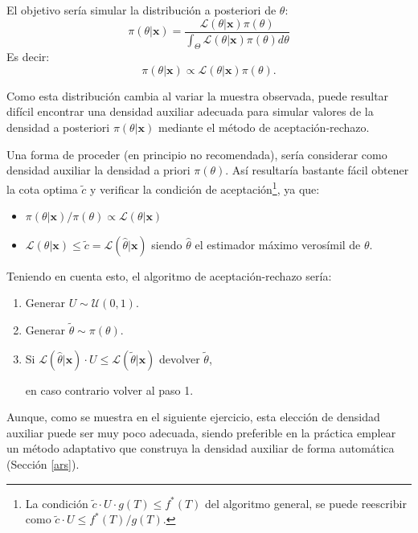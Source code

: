 \documentclass[
  10pt,
]{book}
\renewcommand{\mathbf}[1]{\symbf{#1}}
\theoremstyle{break}
\theoremstyle{nonumberplain}
\let\oldfootnote\footnote
\renewcommand\footnote[1]{\oldfootnote{\hspace{2mm}#1}}
\begin{document}
El objetivo sería simular la distribución a posteriori de \(\theta\):
\[\pi(\theta|\mathbf{x}) = \frac{\mathcal{L}(\theta | \mathbf{x})\pi(\theta)}{\int_\Theta \mathcal{L}(\theta | \mathbf{x})\pi(\theta)d\theta}\]
Es decir:
\[\pi(\theta | \mathbf{x}) \propto \mathcal{L}(\theta | \mathbf{x})\pi(\theta).\]

Como esta distribución cambia al variar la muestra observada, puede resultar difícil encontrar una densidad auxiliar adecuada para simular valores de la densidad a posteriori \(\pi(\theta|\mathbf{x})\) mediante el método de aceptación-rechazo.

Una forma de proceder (en principio no recomendada), sería considerar como densidad auxiliar la densidad a priori \(\pi(\theta)\).
Así resultaría bastante fácil obtener la cota optima \(\tilde{c}\) y verificar la condición de aceptación\footnote{La condición \(\tilde{c} \cdot U \cdot g(T) \leq f^{\ast}(T)\) del algoritmo general, se puede reescribir como \(\tilde{c} \cdot U \leq f^{\ast}(T) / g(T)\).}, ya que:

\begin{itemize}
\item
  \(\pi(\theta |\mathbf{x})/\pi(\theta)\propto \mathcal{L}(\theta | \mathbf{x})\)
\item
  \(\mathcal{L}(\theta | \mathbf{x}) \leq \tilde{c} = \mathcal{L}(\hat{\theta} | \mathbf{x})\) siendo
  \(\hat{\theta}\) el estimador máximo verosímil de \(\theta\).
\end{itemize}

Teniendo en cuenta esto, el algoritmo de aceptación-rechazo sería:

\begin{enumerate}
\def\labelenumi{\arabic{enumi}.}
\item
  Generar \(U \sim \mathcal{U}(0, 1)\).
\item
  Generar \(\tilde{\theta}\sim \pi(\theta)\).
\item
  Si \(\mathcal{L}(\hat{\theta} | \mathbf{x}) \cdot U \leq \mathcal{L}(\tilde{\theta} | \mathbf{x})\) devolver \(\tilde{\theta}\),

  en caso contrario volver al paso 1.
\end{enumerate}

Aunque, como se muestra en el siguiente ejercicio, esta elección de densidad auxiliar puede ser muy poco adecuada, siendo preferible en la práctica emplear un método adaptativo que construya la densidad auxiliar de forma automática (Sección \ref{ars}).
\end{document}
